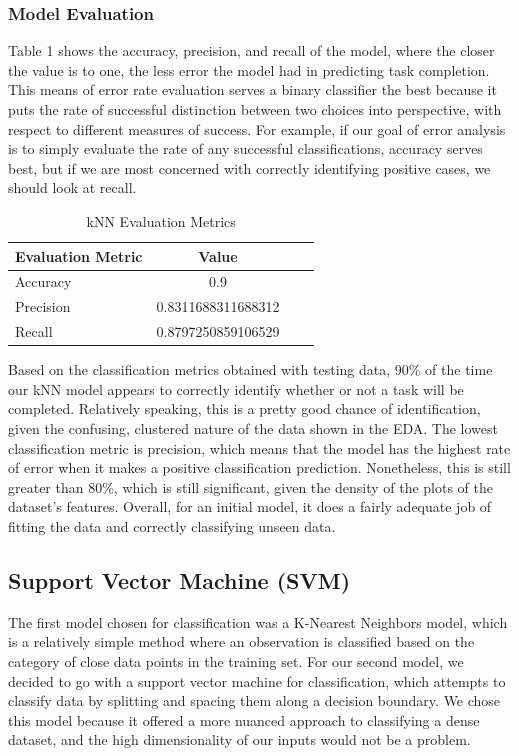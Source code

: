\documentclass[11pt]{article}
\begin{document}
\subsubsection{Model Evaluation}
Table 1 shows the accuracy, precision, and recall of the model, where the closer the value is to one, the less error the model had in predicting task completion. This means of error rate evaluation serves a binary classifier the best because it puts the rate of successful distinction between two choices into perspective, with respect to different measures of success. For example, if our goal of error analysis is to simply evaluate the rate of any successful classifications, accuracy serves best, but if we are most concerned with correctly identifying positive cases, we should look at recall.

\begin{table}[hbt!]
   \large
   \centering
   \begin{tabular}{lccr}
   \hline
   \textbf{Evaluation Metric} & \textbf{Value} \\ 
   \hline
   Accuracy & 0.9  \\
   Precision & 0.8311688311688312  \\
   Recall & 0.8797250859106529  \\
   \end{tabular}
   \caption{kNN Evaluation Metrics} 
\end{table}


Based on the classification metrics obtained with testing data, 90\% of the time our kNN model appears to correctly identify whether or not a task will be completed. Relatively speaking, this is a pretty good chance of identification, given the confusing, clustered nature of the data shown in the EDA. The lowest classification metric is precision, which means that the model has the highest rate of error when it makes a positive classification prediction. Nonetheless, this is still greater than 80\%, which is still significant, given the density of the plots of the dataset's features. Overall, for an initial model, it does a fairly adequate job of fitting the data and correctly classifying unseen data.

\subsection{Support Vector Machine (SVM)}
The first model chosen for classification was a K-Nearest Neighbors model, which is a relatively simple method where an observation is classified based on the category of close data points in the training set. For our second model, we decided to go with a support vector machine for classification, which attempts to classify data by splitting and spacing them along a decision boundary. We chose this model because it offered a more nuanced approach to classifying a dense dataset, and the high dimensionality of our inputs would not be a problem.
\end{document}

